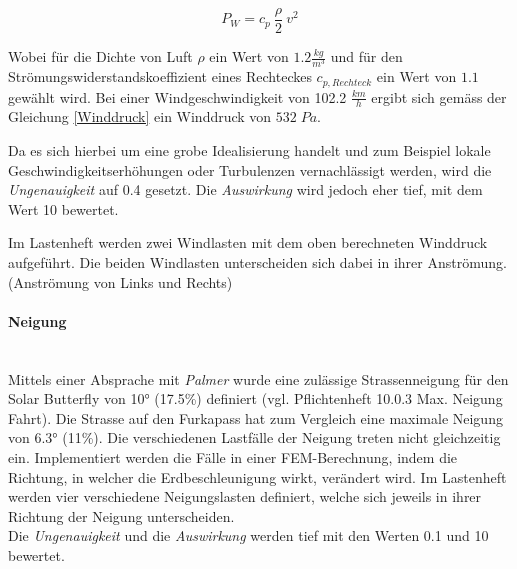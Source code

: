   \begin{equation}
    \label{Winddruck}
    P_W = c_p \: \frac{\rho}{2}\: v^2
  \end{equation}

  Wobei für die Dichte von Luft $\rho$ ein Wert von $1.2 \frac{kg}{m^3}$ und für den Strömungswiderstandskoeffizient eines Rechteckes $c_{p,Rechteck}$ ein Wert von $1.1$ gewählt wird. Bei einer Windgeschwindigkeit von 102.2 $\frac{km}{h}$ ergibt sich gemäss der Gleichung \ref{Winddruck} ein Winddruck von $532 \; Pa$.

  Da es sich hierbei um eine grobe Idealisierung handelt und zum Beispiel lokale Geschwindigkeitserhöhungen oder Turbulenzen vernachlässigt werden, wird die \emph{Ungenauigkeit} auf 0.4 gesetzt. Die \emph{Auswirkung} wird jedoch eher tief, mit dem Wert 10 bewertet.

  Im Lastenheft werden zwei Windlasten mit dem oben berechneten Winddruck aufgeführt. Die beiden Windlasten unterscheiden sich dabei in ihrer Anströmung. (Anströmung von Links und Rechts)


  \paragraph{Neigung}\mbox{}\\
  Mittels einer Absprache mit \emph{Palmer} wurde eine zulässige Strassenneigung für den Solar Butterfly von 10° (17.5\%) definiert (vgl. Pflichtenheft 10.0.3 Max. Neigung Fahrt). Die Strasse auf den Furkapass hat zum Vergleich eine maximale Neigung von 6.3° (11\%). Die verschiedenen Lastfälle der Neigung treten nicht gleichzeitig ein. Implementiert werden die Fälle in einer FEM-Berechnung, indem die Richtung, in welcher die Erdbeschleunigung wirkt, verändert wird. Im Lastenheft werden vier verschiedene Neigungslasten definiert, welche sich jeweils in ihrer Richtung der Neigung unterscheiden.\\
  Die \emph{Ungenauigkeit} und die \emph{Auswirkung} werden tief mit den Werten 0.1 und 10 bewertet.




